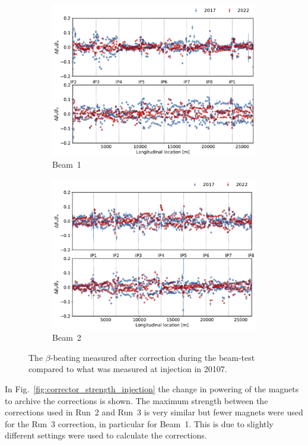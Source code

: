 \documentclass[a4paper]{cernatsnote}
\begin{document}
\begin{figure}[ht]
\begin{subfigure}{.5\textwidth}
  \centering
  \includegraphics[width=.8\linewidth]{plots/beam1/after_corr_2017_vs_2021.pdf}  
  \caption{Beam~1}
\end{subfigure}
\begin{subfigure}{.5\textwidth}
  \centering
  \includegraphics[width=.8\linewidth]{plots/beam2/after_corr_2017_vs_2021_beam2.pdf}  
  \caption{Beam~2}
\end{subfigure}
\caption{The $\beta$-beating measured after correction during the beam-test compared to what was measured at injection in 20107.}
\label{fig:2017_beta_beat_vs_2021}
\end{figure}

In Fig.~\ref{fig:corrector_strength_injection} the change in powering of the magnets to archive the corrections is shown. The maximum strength between the corrections used in Run~2 and Run~3 is very similar but fewer magnets were used for the Run~3 correction, in particular for Beam~1. This is due to slightly different settings were used to calculate the corrections.  
\end{document}
